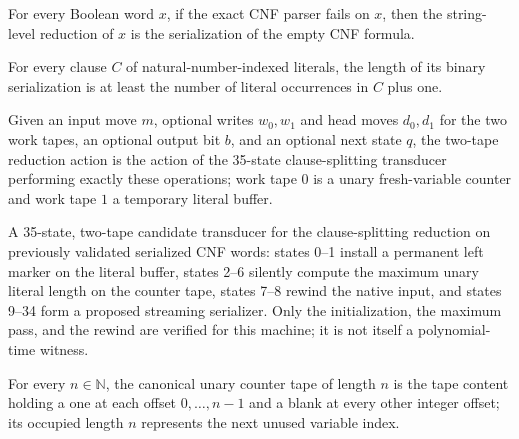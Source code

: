 \begin{lemma}
\label{Complexity.satReduction_fallback}
\leanok
{}
For every Boolean word $x$, if the exact CNF parser fails on $x$, then the string-level
reduction of $x$ is the serialization of the empty CNF formula.
\end{lemma}

\begin{lemma}
\label{Complexity.sat_clause_measure}
\leanok
{}
For every clause $C$ of natural-number-indexed literals, the length of its binary
serialization is at least the number of literal occurrences in $C$ plus one.
\end{lemma}
\begin{definition}
\label{Complexity.satRedAction}
\leanok
{}
Given an input move $m$, optional writes $w_0, w_1$ and head moves $d_0, d_1$ for
the two work tapes, an optional output bit $b$, and an optional next state $q$,
the two-tape reduction action is the action of the 35-state clause-splitting
transducer performing exactly these operations; work tape $0$ is a unary
fresh-variable counter and work tape $1$ a temporary literal buffer.
\end{definition}

\begin{definition}
\label{Complexity.satRedTM}
\leanok
{}
A 35-state, two-tape candidate transducer for the clause-splitting reduction on
previously validated serialized CNF words: states 0--1 install a permanent left
marker on the literal buffer, states 2--6 silently compute the maximum unary
literal length on the counter tape, states 7--8 rewind the native input, and
states 9--34 form a proposed streaming serializer. Only the initialization, the
maximum pass, and the rewind are verified for this machine; it is not itself a
polynomial-time witness.
\end{definition}

\begin{definition}
\label{Complexity.satRedCounter}
\leanok
{}
For every $n \in \mathbb{N}$, the canonical unary counter tape of length $n$ is
the tape content holding a one at each offset $0, \dots, n - 1$ and a blank at
every other integer offset; its occupied length $n$ represents the next unused
variable index.
\end{definition}

